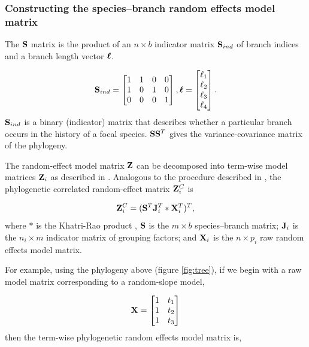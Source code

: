 \documentclass[12pt]{article}
\begin{document}
\subsubsection*{Constructing the species--branch random effects model matrix}

The ${\mathbf S}$ matrix is the product of an $n \times b$ indicator matrix ${\mathbf S}_{ind}$ of branch indices and a branch length vector ${\boldsymbol \ell}$.

\begin{align}
{\mathbf S}_{ind} = \begin{bmatrix}
1 & 1 & 0 & 0 \\ 
1 & 0 & 1 & 0 \\ 
0 & 0 & 0 & 1
\end{bmatrix} , 
{\boldsymbol \ell} = \begin{bmatrix}
\ell_1 \\
\ell_2 \\
\ell_3 \\
\ell_4 
\end{bmatrix} .
\label{eq:S}
\end{align}
${\mathbf S}_{ind}$ is a binary (indicator) matrix that describes whether a particular branch occurs in the history of a focal species. 
${\mathbf S} {\mathbf S}^T$ gives the variance-covariance matrix of the phylogeny. 

The random-effect model matrix ${\mathbf Z}$ can be decomposed into term-wise model matrices ${\mathbf Z}_{i}$ as described in \citet{bates2015fitting}.
Analogous to the procedure described in \citet{bates2015fitting}, the phylogenetic correlated random-effect matrix ${\mathbf Z}^{C}_{i}$ is

\begin{equation}
{\mathbf Z}^{C}_{i} = ({\mathbf S}^{T}{\mathbf J}^{T}_{i} \ast {\mathbf X}^{T}_{i})^{T}, \label{eq:ZC}
\end{equation}
where $\ast$ is the Khatri-Rao product \citep{khatri1968solutions}, ${\mathbf S}$ is the $m \times b$ species--branch matrix; ${\mathbf J}_{i}$ is the $n_i \times m$ indicator matrix of grouping factors; and ${\mathbf X}_{i}$ is the $n \times p_{i}$ raw random effects model matrix. 

For example, using the phylogeny above (figure \ref{fig:tree}), if we begin with a raw model matrix corresponding to a random-slope model, 

\begin{align}
{\mathbf X} = \begin{bmatrix}
1 & t_1  \\ 
1 & t_2  \\ 
1 & t_3 
\end{bmatrix} 
\end{align}
then the term-wise phylogenetic random effects model matrix is,
\end{document}
